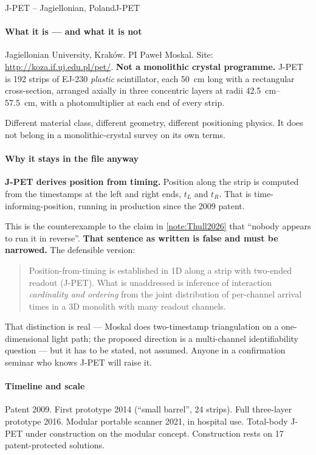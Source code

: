 \begin{programnote}{J-PET -- Jagiellonian, Poland}{J-PET}
 
\paragraph{What it is --- and what it is not}
Jagiellonian University, Kraków. PI Paweł Moskal. Site:
\url{http://koza.if.uj.edu.pl/pet/}. \textbf{Not a monolithic
crystal programme.} J-PET is 192 strips of EJ-230 \emph{plastic} scintillator,
each \qty{50}{\centi\metre} long with a 
rectangular cross-section, arranged axially in three concentric layers at radii
\qtyrange{42.5}{57.5}{\centi\metre}, with a photomultiplier at each end of every
strip.
 
Different material class, different geometry, different positioning physics. It
does not belong in a monolithic-crystal survey on its own terms.
 
\paragraph{Why it stays in the file anyway}
\textbf{J-PET derives position from timing.} Position along the strip is computed
from the timestamps at the left and right ends, $t_L$ and $t_R$. That is
time-informing-position, running in production since the 2009 patent.
 
This is the counterexample to the claim in \ref{note:Thull2026} that ``nobody
appears to run it in reverse''. \textbf{That sentence as written is false and
must be narrowed.} The defensible version:
 
\begin{quote}
	Position-from-timing is established in 1D along a strip with two-ended
	readout (J-PET). What is unaddressed is inference of interaction
	\emph{cardinality and ordering} from the joint distribution of per-channel
	arrival times in a 3D monolith with many readout channels.
\end{quote}
 
That distinction is real --- Moskal does two-timestamp triangulation on a
one-dimensional light path; the proposed direction is a multi-channel
identifiability question --- but it has to be stated, not assumed. Anyone in a
confirmation seminar who knows J-PET will raise it.
 
\paragraph{Timeline and scale}
Patent 2009. First prototype 2014 (``small barrel'', 24 strips). Full three-layer
prototype 2016. Modular portable scanner 2021, in hospital use. Total-body J-PET
under construction on the modular concept. Construction rests on 17
patent-protected solutions.
 

\end{programnote}
